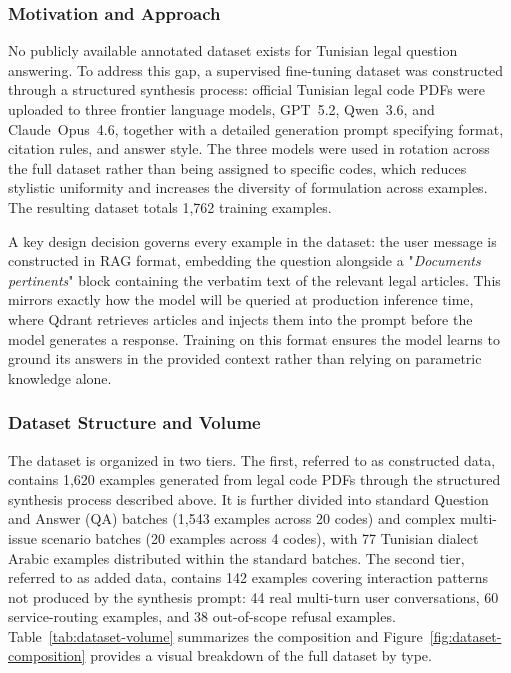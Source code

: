 \subsubsection{Motivation and Approach}

No publicly available annotated dataset exists for Tunisian legal question answering. To address this gap, a supervised fine-tuning dataset was constructed through a structured synthesis process: official Tunisian legal code \acp{PDF} were uploaded to three frontier language models, GPT~5.2, Qwen~3.6, and Claude~Opus~4.6, together with a detailed generation prompt specifying format, citation rules, and answer style. The three models were used in rotation across the full dataset rather than being assigned to specific codes, which reduces stylistic uniformity and increases the diversity of formulation across examples. The resulting dataset totals 1,762 training examples.

\vspace{1em}

A key design decision governs every example in the dataset: the user message is constructed in \ac{RAG} format, embedding the question alongside a "\textit{Documents pertinents}" block containing the verbatim text of the relevant legal articles. This mirrors exactly how the model will be queried at production inference time, where Qdrant retrieves articles and injects them into the prompt before the model generates a response. Training on this format ensures the model learns to ground its answers in the provided context rather than relying on parametric knowledge alone.

\subsubsection{Dataset Structure and Volume}

The dataset is organized in two tiers. The first, referred to as constructed data, contains 1,620 examples generated from legal code \acp{PDF} through the structured synthesis process described above. It is further divided into standard Question and Answer (\ac{QA}) batches (1,543 examples across 20 codes) and complex multi-issue scenario batches (20 examples across 4 codes), with 77 Tunisian dialect Arabic examples distributed within the standard batches. The second tier, referred to as added data, contains 142 examples covering interaction patterns not produced by the synthesis prompt: 44 real multi-turn user conversations, 60 service-routing examples, and 38 out-of-scope refusal examples. Table~\ref{tab:dataset-volume} summarizes the composition and Figure~\ref{fig:dataset-composition} provides a visual breakdown of the full dataset by type.

